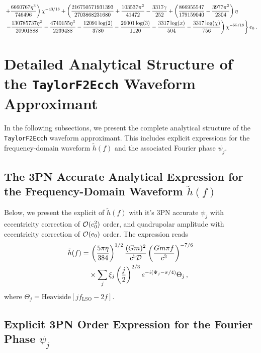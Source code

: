 \documentclass[aps,prd,twocolumn,superscriptaddress,groupedaddress,nofootinbib,showpacs,eqsecnum,useAms]{revtex4-2}
\renewcommand{\theequation}{\arabic{equation}}
\begin{document}
\begin{widetext}
\begin{subequations}
\begin{align}
&\left. +\frac{6660767 \eta ^3}{746496}\right) \chi ^{-43/18}+\left(\frac{216750571931393}{2703868231680}+\frac{103537 \pi ^2}{41472}-\frac{3317 \gamma }{252} +\left(\frac{866955547}{179159040}-\frac{3977 \pi^2}{2304}\right) \eta \right.\notag \\ 
&\left.\left. -\frac{130785737 \eta ^2}{20901888}-\frac{4740155 \eta ^3}{2239488}-\frac{12091 \log (2)}{3780}-\frac{26001 \log(3)}{1120} -\frac{3317 \log (x)}{504}-\frac{3317 \log (\chi )}{756}\right)\chi ^{-55/18}\right\}e_0 \,.
\end{align}
\end{subequations}
\end{widetext}

\renewcommand{\theequation}{B\arabic{equation}} %
\section{Detailed Analytical Structure of the \texttt{TaylorF2Ecch} Waveform Approximant} \label{sec: TaylorF2Ecch_full}

In the following subsections, we present the complete analytical structure of the \texttt{TaylorF2Ecch} waveform approximant. This includes explicit expressions for the frequency-domain waveform $\tilde{h}(f)$ and the associated Fourier phase $\psi_j$.

\subsection{The 3PN Accurate Analytical Expression for the Frequency-Domain Waveform $\tilde{h}(f)$} \label{sec: TaylorF2Ecch hf}

Below, we present the explicit of $\tilde{h}(f)$ with it's 3PN accurate $\psi_{j}$ with eccentricity correction of ${\cal O}(e_0^2)$ order, and quadrupolar amplitude with eccentricity correction of ${\cal O}(e_0)$ order. The expression reads
\begin{align}
\tilde{h}(f) = & \, \left( \frac{5\pi \eta}{384} \right)^{1/2} \frac{(G m)^2}{c^5 {\cal D}} \left(\frac{Gm\pi f}{c^3}\right)^{-7/6} \notag \\
&\times \sum_{j} \xi_{j} \left(\frac{j}{2}\right)^{2/3} e^{-i(\Psi_{j}-\pi/4)} \Theta_{j}\,,
\end{align}
where $\Theta_{j} = \text{Heaviside}\left[  j f_{\text{LSO}}-2f \right]$.

\subsection{Explicit 3PN Order Expression for the Fourier Phase $\psi_{j}$} \label{sec: TaylorF2Ecch_psi}
\end{document}
